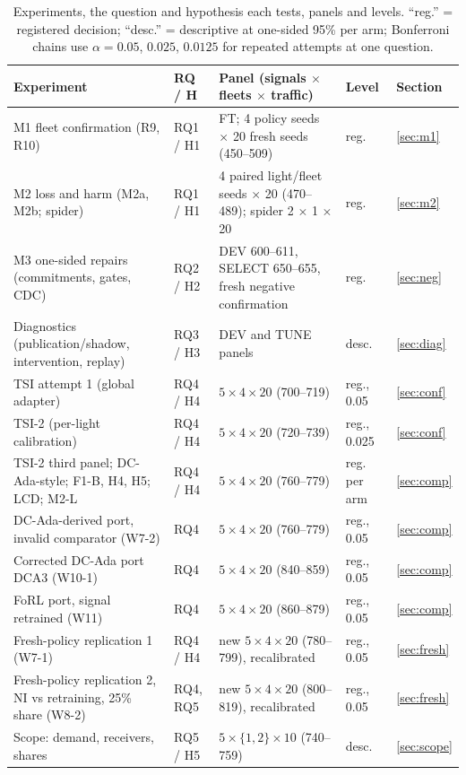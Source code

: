 \begin{table}[t]\centering\footnotesize
\caption{Experiments, the question and hypothesis each tests, panels and levels. ``reg.'' = registered decision; ``desc.'' = descriptive
at one-sided 95\% per arm; Bonferroni chains use $\alpha=0.05$, $0.025$, $0.0125$ for repeated attempts at one question.}\label{tab:expmap}
\begin{tabular}{@{}p{5.3cm}p{1.5cm}p{6.0cm}p{2.5cm}l@{}}\toprule
Experiment & RQ / H & Panel (signals $\times$ fleets $\times$ traffic) & Level & Section\\\midrule
M1 fleet confirmation (R9, R10) & RQ1 / H1 & FT; 4 policy seeds $\times$ 20 fresh seeds (450--509) & reg. & \ref{sec:m1}\\
M2 loss and harm (M2a, M2b; spider) & RQ1 / H1 & 4 paired light/fleet seeds $\times$ 20 (470--489); spider 2 $\times$ 1 $\times$ 20 & reg. & \ref{sec:m2}\\
M3 one-sided repairs (commitments, gates, CDC) & RQ2 / H2 & DEV 600--611, SELECT 650--655, fresh negative confirmation & reg. & \ref{sec:neg}\\
Diagnostics (publication/shadow, intervention, replay) & RQ3 / H3 & DEV and TUNE panels & desc. & \ref{sec:diag}\\
TSI attempt 1 (global adapter) & RQ4 / H4 & $5\times4\times20$ (700--719) & reg., 0.05 & \ref{sec:conf}\\
TSI-2 (per-light calibration) & RQ4 / H4 & $5\times4\times20$ (720--739) & reg., 0.025 & \ref{sec:conf}\\
TSI-2 third panel; DC-Ada-style; F1-B, H4, H5; LCD; M2-L & RQ4 / H4 & $5\times4\times20$ (760--779) & reg. per arm & \ref{sec:comp}\\
DC-Ada-derived port, invalid comparator (W7-2) & RQ4 & $5\times4\times20$ (760--779) & reg., 0.05 & \ref{sec:comp}\\
Corrected DC-Ada port DCA3 (W10-1) & RQ4 & $5\times4\times20$ (840--859) & reg., 0.05 & \ref{sec:comp}\\
FoRL port, signal retrained (W11) & RQ4 & $5\times4\times20$ (860--879) & reg., 0.05 & \ref{sec:comp}\\
Fresh-policy replication 1 (W7-1) & RQ4 / H4 & new $5\times4\times20$ (780--799), recalibrated & reg., 0.05 & \ref{sec:fresh}\\
Fresh-policy replication 2, NI vs retraining, 25\% share (W8-2) & RQ4, RQ5 & new $5\times4\times20$ (800--819), recalibrated & reg., 0.05 & \ref{sec:fresh}\\
Scope: demand, receivers, shares & RQ5 / H5 & $5\times\{1,2\}\times10$ (740--759) & desc. & \ref{sec:scope}\\

\end{tabular}
\end{table}
